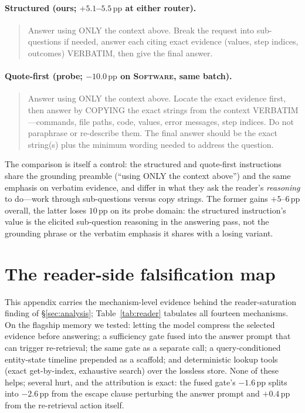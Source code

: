 \documentclass{article} %
\newcommand{\pp}{\,\mathrm{pp}}
\begin{document}
\paragraph{Structured (ours; $+5.1$--$5.5\pp$ at either router).}
\begin{quote}\small
Answer using ONLY the context above. Break the request into sub-questions if
needed, answer each citing exact evidence (values, step indices, outcomes)
VERBATIM, then give the final answer.
\end{quote}

\paragraph{Quote-first (probe; $-10.0\pp$ on \textsc{Software}, same batch).}
\begin{quote}\small
Answer using ONLY the context above. Locate the exact evidence first, then
answer by COPYING the exact strings from the context VERBATIM---commands, file
paths, code, values, error messages, step indices. Do not paraphrase or
re-describe them. The final answer should be the exact string(s) plus the
minimum wording needed to address the question.
\end{quote}

The comparison is itself a control: the structured and quote-first
instructions share the grounding preamble (``using ONLY the context above'')
and the same emphasis on verbatim evidence, and differ in what they ask the
reader's \emph{reasoning} to do---work through sub-questions versus copy
strings. The former gains $+5$--$6\pp$ overall, the latter loses $10\pp$ on its
probe domain: the structured instruction's value is the elicited sub-question
reasoning in the answering pass, not the grounding phrase or the verbatim
emphasis it shares with a losing variant.


\section{The reader-side falsification map}
\label{app:readermap}

This appendix carries the mechanism-level evidence behind the reader-saturation
finding of \S\ref{sec:analysis}; Table~\ref{tab:reader} tabulates all fourteen
mechanisms. On the flagship memory we tested: letting the model compress the
selected evidence before answering; a sufficiency gate fused into the answer
prompt that can trigger re-retrieval; the same gate as a separate call; a
query-conditioned entity-state timeline prepended as a scaffold; and
deterministic lookup tools (exact get-by-index, exhaustive search) over the
lossless store. None of these helps; several hurt, and the attribution is
exact: the fused gate's $-1.6\pp$ splits into $-2.6\pp$ from the escape
clause perturbing the answer prompt and $+0.4\pp$ from the re-retrieval
action itself.
\end{document}
